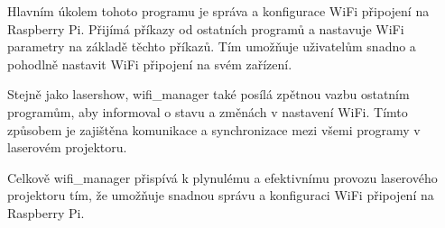 

Hlavním úkolem tohoto programu je správa a konfigurace WiFi připojení na Raspberry Pi. Přijímá příkazy od ostatních programů a nastavuje WiFi parametry na základě těchto příkazů. Tím umožňuje uživatelům snadno a pohodlně nastavit WiFi připojení na svém zařízení.

Stejně jako lasershow, wifi\_manager také posílá zpětnou vazbu ostatním programům, aby informoval o stavu a změnách v nastavení WiFi. Tímto způsobem je zajištěna komunikace a synchronizace mezi všemi programy v laserovém projektoru.

Celkově wifi\_manager přispívá k plynulému a efektivnímu provozu laserového projektoru tím, že umožňuje snadnou správu a konfiguraci WiFi připojení na Raspberry Pi.